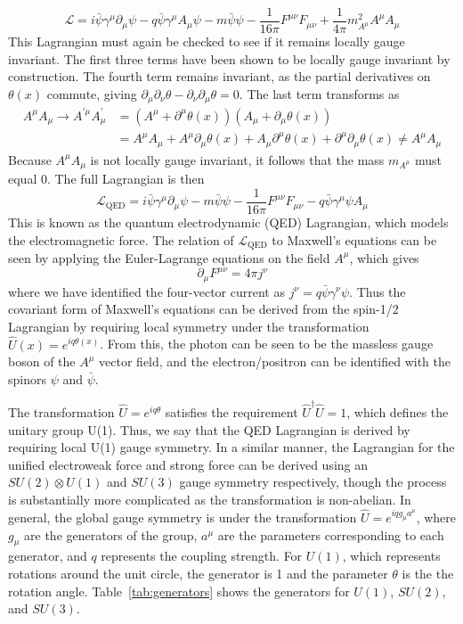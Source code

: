 \begin{equation}
	\mathcal{L}=i\bar{\psi}\gamma^\mu\partial_\mu\psi-q\bar{\psi}\gamma^\mu A_\mu\psi-m\bar{\psi}\psi-\frac{1}{16\pi}F^{\mu\nu}F_{\mu\nu}+\frac{1}{4\pi}m_{A^\mu}^2A^\mu A_\mu
\end{equation}
This Lagrangian must again be checked to see if it remains locally gauge invariant. The first three terms have been shown to be locally gauge invariant by construction. The fourth term remains invariant, as the partial derivatives on $\theta(x)$ commute, giving $\partial_\mu\partial_\nu\theta-\partial_\nu\partial_\mu\theta=0$. The last term transforms as
\begin{align}
	A^\mu A_\mu\to A^{\prime\mu}A_\mu^\prime&=(A^\mu+\partial^\mu\theta(x))(A_\mu+\partial_\mu\theta(x))\\
	&=A^\mu A_\mu+A^\mu\partial_\mu\theta(x)+A_\mu\partial^\mu\theta(x)+\partial^\mu\partial_\mu\theta(x)\neq A^\mu A_\mu
\end{align}
Because $A^\mu A_\mu$ is not locally gauge invariant, it follows that the mass $m_{A^\mu}$ must equal 0. The full Lagrangian is then
\begin{equation}
	\mathcal{L}_\text{QED}=i\bar{\psi}\gamma^\mu\partial_\mu\psi-m\bar{\psi}\psi-\frac{1}{16\pi}F^{\mu\nu}F_{\mu\nu}-q\bar{\psi}\gamma^\mu\psi A_\mu
\end{equation}
This is known as the quantum electrodynamic (QED) Lagrangian, which models the electromagnetic force. The relation of $\mathcal{L}_\text{QED}$ to Maxwell's equations can be seen by applying the Euler-Lagrange equations on the field $A^\mu$, which gives
\begin{equation}
	\label{eq:maxwell}
	\partial_\mu F^{\mu\nu}=4\pi j^\nu
\end{equation}
where we have identified the four-vector current as $j^\nu=q\bar{\psi}\gamma^\nu\psi$. Thus the covariant form of Maxwell's equations can be derived from the spin-1/2 Lagrangian by requiring local symmetry under the transformation $\hat{U}(x)=e^{iq\theta(x)}$. From this, the photon can be seen to be the massless gauge boson of the $A^\mu$ vector field, and the electron/positron can be identified with the spinors $\psi$ and $\bar{\psi}$.

The transformation $\hat{U}=e^{iq\theta}$ satisfies the requirement $\hat{U}^\dagger\hat{U}=1$, which defines the unitary group U(1). Thus, we say that the QED Lagrangian is derived by requiring local U(1) gauge symmetry. In a similar manner, the Lagrangian for the unified electroweak force and strong force can be derived using an $SU(2)\otimes U(1)$ and $SU(3)$ gauge symmetry respectively, though the process is substantially more complicated as the transformation is non-abelian. In general, the global gauge symmetry is under the transformation $\hat{U}=e^{iqg_\mu a^\mu}$, where $g_\mu$ are the generators of the group, $a^\mu$ are the parameters corresponding to each generator, and $q$ represents the coupling strength. For $U(1)$, which represents rotations around the unit circle, the generator is 1 and the parameter $\theta$ is the  the rotation angle. Table~\ref{tab:generators} shows the generators for $U(1)$, $SU(2)$, and $SU(3)$.

